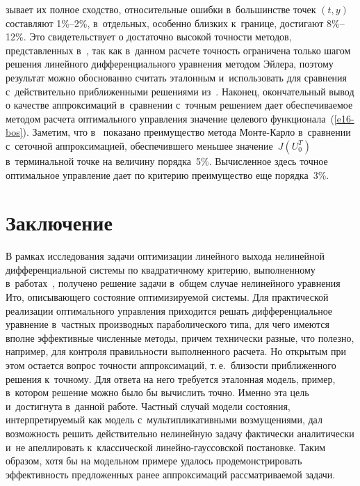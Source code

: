 \begin{multicols}{2}
\noindent
зывает их полное сходство, 
относительные ошибки в~большинстве точек $(t,y)$ составляют 1\%--2\%, 
в~отдельных, особенно близких к~границе, достигают 8\%--12\%. Это 
свидетельствует о достаточно высокой точности методов, представленных 
в~\cite{2-bos, 4-bos}, так как в~данном расчете точность ограничена только 
шагом решения линейного дифференциального уравнения методом Эйлера, 
поэтому результат можно обоснованно считать эталонным и~использовать для 
сравнения с~действительно приближенными решениями  
из~\cite{2-bos, 4-bos}. Наконец, окончательный вывод о качестве 
аппроксимаций в~сравнении с~точным решением дает обеспечиваемое 
методом расчета оптимального управления значение целевого 
функционала~(\ref{e16-bos}). Заметим, что в~\cite{4-bos} показано 
преимущество метода Монте-Карло в~сравнении с~сеточной аппроксимацией, 
обеспечившего меньшее значение~$J(U_0^{{T}})$ в~терминальной точке на 
величину порядка~5\%. Вычисленное здесь точное оптимальное управление 
дает по критерию преимущество еще порядка~3\%.


     

\section*{Заключение}

     В рамках исследования задачи оптимизации линейного выхода 
нелинейной дифференциальной системы по квадратичному критерию, 
выполненному в~работах~\cite{1-bos, 2-bos, 3-bos, 4-bos}, получено решение задачи в~общем случае 
нелинейного уравнения Ито, описывающего состояние оптимизируемой 
системы. Для практической реализации оптимального управления 
приходится решать дифференциальное уравнение в~частных производных 
параболического типа, для чего имеются вполне эффективные чис\-лен\-ные 
методы, причем технически разные, что полезно, например, для контроля 
правильности выполненного расчета. Но открытым при этом остается вопрос 
точности аппроксимаций, т.\,е.\ бли\-зости приближенного решения 
к~точному. Для ответа на него требуется эталонная модель, пример, 
в~котором решение можно было бы вычислить точ\-но. Именно эта цель 
и~достигнута в~данной работе. Частный случай модели состояния, 
интерпретируемый как модель с~мультипликативными возмущениями, дал 
возможность решить действительно нелинейную задачу фактически 
аналитически и~не апеллировать к~классической  
ли\-ней\-но-гаус\-сов\-ской постановке. Таким образом, хотя бы на 
модельном примере удалось продемонстрировать эффективность 
предложенных ранее аппроксимаций рассматриваемой задачи.
     

\end{multicols}
